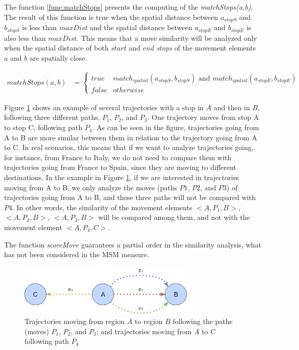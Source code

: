 \documentclass[12pt]{article}
\begin{document}
The function \ref{func:matchStops} presents the computing of the \emph{matchStops(a,b)}. The result of this function is true when the spatial distance between $a_{stopS}$ and $b_{stopS}$ is less than $maxDist$ and the spatial distance between $a_{stopE}$ and $b_{stopE}$ is also less than $maxDist$. This means that a move similarity will be analyzed only when the spatial distance of both $start$ and $end$ \emph{stops} of the movement elements $a$ and $b$ are spatially close. 

\begin{equation}
\label{func:matchStops}
\begin{split}
matchStops(a, b)  & = 
  \begin{cases} 
      true & match_{spatial}(a_{stopS}, b_{stopS}) \text{ and } match_{spatial}(a_{stopE}, b_{stopE})\\
      false & otherwise
  \end{cases}
\end{split}
\end{equation}

Figure \ref{fig:move} shows an example of several trajectories with a stop in $A$ and then in  $B$, following three different paths, $P_1$, $P_2$, and $P_3$. One trajectory moves from stop A to stop C, following path $P_4$. As can be seen in the figure, trajectories going from A to B are more similar between them in relation to the trajectory going from A to C.
In real scenarios, this means that if we want to analyze trajectories going, for instance, from France to Italy, we do not need to compare them with trajectories going from France to Spain, since they are moving to different destinations. In the example in Figure \ref{fig:move}, if we are interested in trajectories moving from A to B, we only analyze the moves (paths $P1$, $P2$, and $P3$) of trajectories going from A to B, and these three paths will not be compared with $P4$. In other words, the similarity of the movement elements $<A, P_1, B>$, $<A, P_2, B>$, $<A, P_3, B>$ will be compared among them, and not with the movement element $<A, P_4, C>$.

The function \emph{scoreMove} guarantees a partial order in the similarity analysis, what has not been considered in the MSM measure.

\begin{figure}[h]
\centering
\includegraphics[width=0.75\textwidth]{Images/Toy_trajectories.jpg}
\caption{\label{fig:move} Trajectories moving from region $A$ to region $B$ following the paths (moves) $P_1$, $P_2$, and $P_3$; and trajectories moving from $A$ to C following path $P_4$}
\end{figure}
\end{document}
